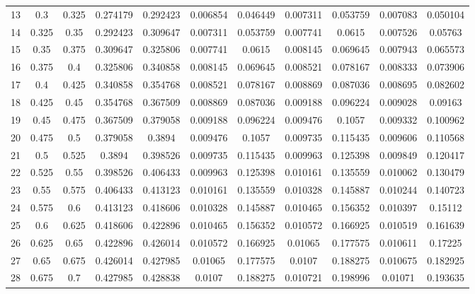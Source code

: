 \documentclass[11pt]{article}
\begin{document}
\begin{table}[H]
{\begin{tabular}{c c c c c c c c c c c}
                13 & 0.3 & 0.325 & 0.274179 & 0.292423 & 0.006854 & 0.046449 & 0.007311 & 0.053759 & 0.007083 & 0.050104 \\
                14 & 0.325 & 0.35 & 0.292423 & 0.309647 & 0.007311 & 0.053759 & 0.007741 & 0.0615 & 0.007526 & 0.05763 \\
                15 & 0.35 & 0.375 & 0.309647 & 0.325806 & 0.007741 & 0.0615 & 0.008145 & 0.069645 & 0.007943 & 0.065573 \\
                16 & 0.375 & 0.4 & 0.325806 & 0.340858 & 0.008145 & 0.069645 & 0.008521 & 0.078167 & 0.008333 & 0.073906 \\
                17 & 0.4 & 0.425 & 0.340858 & 0.354768 & 0.008521 & 0.078167 & 0.008869 & 0.087036 & 0.008695 & 0.082602 \\
                18 & 0.425 & 0.45 & 0.354768 & 0.367509 & 0.008869 & 0.087036 & 0.009188 & 0.096224 & 0.009028 & 0.09163 \\
                19 & 0.45 & 0.475 & 0.367509 & 0.379058 & 0.009188 & 0.096224 & 0.009476 & 0.1057 & 0.009332 & 0.100962 \\
                20 & 0.475 & 0.5 & 0.379058 & 0.3894 & 0.009476 & 0.1057 & 0.009735 & 0.115435 & 0.009606 & 0.110568 \\
                21 & 0.5 & 0.525 & 0.3894 & 0.398526 & 0.009735 & 0.115435 & 0.009963 & 0.125398 & 0.009849 & 0.120417 \\
                22 & 0.525 & 0.55 & 0.398526 & 0.406433 & 0.009963 & 0.125398 & 0.010161 & 0.135559 & 0.010062 & 0.130479 \\
                23 & 0.55 & 0.575 & 0.406433 & 0.413123 & 0.010161 & 0.135559 & 0.010328 & 0.145887 & 0.010244 & 0.140723 \\
                24 & 0.575 & 0.6 & 0.413123 & 0.418606 & 0.010328 & 0.145887 & 0.010465 & 0.156352 & 0.010397 & 0.15112 \\
                25 & 0.6 & 0.625 & 0.418606 & 0.422896 & 0.010465 & 0.156352 & 0.010572 & 0.166925 & 0.010519 & 0.161639 \\
                26 & 0.625 & 0.65 & 0.422896 & 0.426014 & 0.010572 & 0.166925 & 0.01065 & 0.177575 & 0.010611 & 0.17225 \\
                27 & 0.65 & 0.675 & 0.426014 & 0.427985 & 0.01065 & 0.177575 & 0.0107 & 0.188275 & 0.010675 & 0.182925 \\
                28 & 0.675 & 0.7 & 0.427985 & 0.428838 & 0.0107 & 0.188275 & 0.010721 & 0.198996 & 0.01071 & 0.193635 \\

\end{tabular}}
\end{table}
\end{document}
